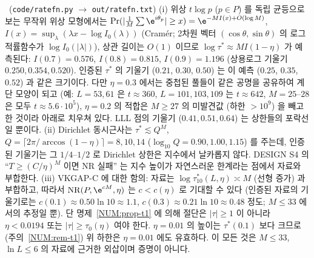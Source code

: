 \begin{remark}[해석]\label{NUM:rem-res-heur}
\HEUR\ (\texttt{code/ratefn.py} $\to$ \texttt{out/ratefn.txt})
(i) 위상 $t\log p$ ($p\in P$) 를 독립 균등으로 보는 무작위 위상 모형에서는 $\Pr(|\frac1M\sum\e^{i\theta_p}|\ge x)=\e^{-M I(x)+O(\log M)}$,
$I(x)=\sup_\lambda(\lambda x-\log I_0(\lambda))$ (Cramér; 2차원 벡터 $(\cos\theta,\sin\theta)$ 의 로그적률함수가 $\log I_0(|\lambda|)$), 상관 길이는 $O(1)$ 이므로
$\log\tau^*\approx M I(1-\eta)$ 가 예측된다: $I(0.7)=0.576$, $I(0.8)=0.815$, $I(0.9)=1.196$ (상용로그 기울기 $0.250,0.354,0.520$).
인증된 $\tau^*$ 의 기울기 ($0.21$, $0.30$, $0.50$) 는 이 예측 ($0.25$, $0.35$, $0.52$) 과 같은 크기이다. 다만 $\eta=0.3$ 에서는 중첩된 풀들이 같은 공명을 공유하여
계단 모양이 되고 (예: $L=53,61$ 은 $t\approx360$, $L=101,103,109$ 는 $t\approx642$, $M=25$--$28$ 은 모두 $t\approx5.6\cdot10^5$), $\eta=0.2$ 의 적합은
$M\ge27$ 의 미발견값 (하한 $>10^{9}$) 을 빼고 한 것이라 아래로 치우쳐 있다. LLL 점의 기울기 ($0.41,0.51,0.64$) 는 상한들의 포락선일 뿐이다.
(ii) Dirichlet 동시근사는 $\tau^*\lesssim Q^M$, $Q=\lceil2\pi/\arccos(1-\eta)\rceil=8,10,14$ ($\log_{10}Q=0.90,1.00,1.15$) 를 주는데, 인증된 기울기는 그 $1/4$--$1/2$ 로
Dirichlet 상한은 지수에서 날카롭지 않다. DESIGN S4 의 ``$T\ge(C/\eta)^M$ 이면 NR 실패'' 는 지수 높이가 자연스러운 한계라는 점에서 자료와 부합한다.
(iii) VKGAP-C 에 대한 함의: 자료는 $\log\tau^*_{10}(L,\eta)\asymp M$ (선형 증가) 과 부합하고, 따라서 $\mathrm{NR}(P,\e^{cM},\eta)$ 는 $c<c(\eta)$ 로
기대할 수 있다 (인증된 자료의 기울기로는 $c(0.1)\approx0.50\ln10\approx1.1$, $c(0.3)\approx0.21\ln10\approx0.48$ 정도; $M\le33$ 에서의 추정일 뿐). 단 명제~\ref{NUM:prop-t1} 에 의해 절단은 $|\tau|\ge1$ 이 아니라
$\eta<0.0194$ 또는 $|\tau|\ge\tau_0(\eta)$ 여야 한다. $\eta=0.01$ 의 높이는 $\tau^*(0.1)$ 보다 크므로 (주의~\ref{NUM:rem-t1}) 위 하한은 $\eta=0.01$ 에도 유효하다.
이 모든 것은 $M\le33$, $\ln L\le6$ 의 자료에 근거한 외삽이며 증명이 아니다.
\end{remark}
